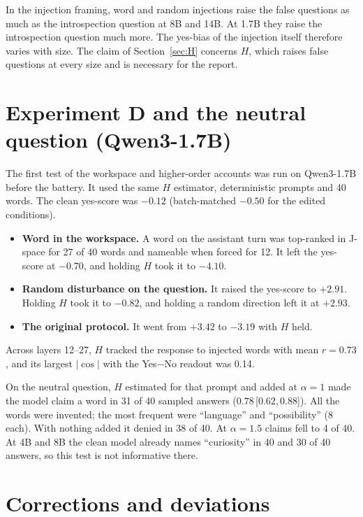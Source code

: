 \documentclass[11pt]{article}
\newcommand{\ci}[3]{\ensuremath{#1}\,[\ensuremath{#2},\allowbreak\,\ensuremath{#3}]}
\newcommand{\ys}{yes-score}
\begin{document}
In the injection framing, word and random injections raise the false questions as much as the introspection question at 8B and 14B. At 1.7B they raise the introspection question much more. The yes-bias of the injection itself therefore varies with size. The claim of Section~\ref{sec:H} concerns $H$, which raises false questions at every size and is necessary for the report.

\section{Experiment D and the neutral question (Qwen3-1.7B)}\label{app:expd}

The first test of the workspace and higher-order accounts was run on Qwen3-1.7B before the battery. It used the same $H$ estimator, deterministic prompts and 40 words. The clean \ys{} was $-0.12$ (batch-matched $-0.50$ for the edited conditions).
\begin{itemize}
  \item \textbf{Word in the workspace.} A word on the assistant turn was top-ranked in J-space for 27 of 40 words and nameable when forced for 12. It left the \ys{} at $-0.70$, and holding $H$ took it to $-4.10$.
  \item \textbf{Random disturbance on the question.} It raised the \ys{} to $+2.91$. Holding $H$ took it to $-0.82$, and holding a random direction left it at $+2.93$.
  \item \textbf{The original protocol.} It went from $+3.42$ to $-3.19$ with $H$ held.
\end{itemize}
Across layers 12--27, $H$ tracked the response to injected words with mean $r=0.73$, and its largest $|\cos|$ with the Yes$-$No readout was 0.14.

On the neutral question, $H$ estimated for that prompt and added at $\alpha=1$ made the model claim a word in 31 of 40 sampled answers (\ci{0.78}{0.62}{0.88}). All the words were invented; the most frequent were ``language'' and ``possibility'' (8 each). With nothing added it denied in 38 of 40. At $\alpha=1.5$ claims fell to 4 of 40. At 4B and 8B the clean model already names ``curiosity'' in 40 and 30 of 40 answers, so this test is not informative there.

\section{Corrections and deviations}\label{app:corrections}
\end{document}
